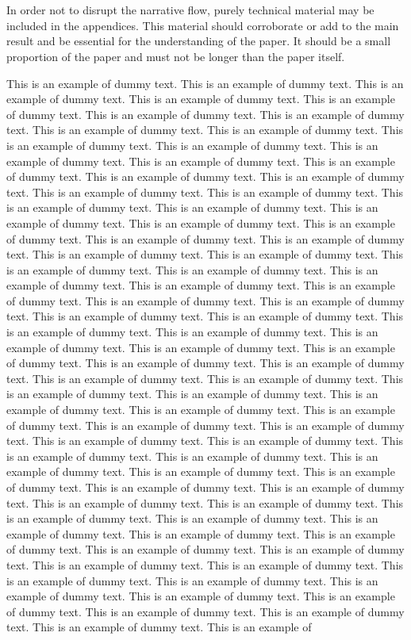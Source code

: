 \documentclass[lineno]{jfm}
\begin{document}
\appendix

\section{}\label{appA}
 In order not to disrupt the narrative flow, purely technical material may be included in the appendices. This material should corroborate or add to the main result and be essential for the understanding of the paper. It should be a small proportion of the paper and must not be longer than the paper itself.

This is an example of dummy text. This is an example of dummy text. This is an example of dummy text. This is an example of dummy text. This is an example of dummy text. This is an example of dummy text. This is an example of dummy text. This is an example of dummy text. This is an example of dummy text. This is an example of dummy text. This is an example of dummy text. This is an example of dummy text. This is an example of dummy text. This is an example of dummy text. This is an example of dummy text. This is an example of dummy text. This is an example of dummy text. This is an example of dummy text. This is an example of dummy text. This is an example of dummy text. This is an example of dummy text. This is an example of dummy text. This is an example of dummy text. This is an example of dummy text. This is an example of dummy text. This is an example of dummy text. This is an example of dummy text. This is an example of dummy text. This is an example of dummy text. This is an example of dummy text. This is an example of dummy text. This is an example of dummy text. This is an example of dummy text. This is an example of dummy text. This is an example of dummy text. This is an example of dummy text. This is an example of dummy text. This is an example of dummy text. This is an example of dummy text. This is an example of dummy text. This is an example of dummy text. This is an example of dummy text. This is an example of dummy text. This is an example of dummy text. This is an example of dummy text. This is an example of dummy text. This is an example of dummy text. This is an example of dummy text. This is an example of dummy text. This is an example of dummy text. This is an example of dummy text. This is an example of dummy text. This is an example of dummy text. This is an example of dummy text. This is an example of dummy text. This is an example of dummy text. This is an example of dummy text. This is an example of dummy text. This is an example of dummy text. This is an example of dummy text. This is an example of dummy text. This is an example of dummy text. This is an example of dummy text. This is an example of dummy text. This is an example of dummy text. This is an example of dummy text. This is an example of dummy text. This is an example of dummy text. This is an example of dummy text. This is an example of dummy text. This is an example of dummy text. This is an example of dummy text. This is an example of dummy text. This is an example of dummy text. This is an example of dummy text. This is an example of dummy text. This is an example of dummy text. This is an example of dummy text. This is an example of dummy text. This is an example of dummy text. This is an example of 
\end{document}
